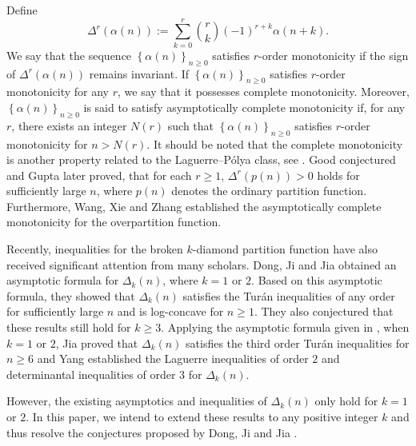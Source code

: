 \documentclass[12pt]{article}
\numberwithin{equation}{section}
\begin{document}
Define
$$
\Delta^r \left(\alpha(n)\right):=\sum_{k=0}^r\binom{r}{k}(-1)^{r+k} \alpha(n+k) .
$$
We say that the sequence $\left\{\alpha(n)\right\}_{n \geq 0}$ satisfies $r$-order monotonicity if the sign of $\Delta^r \left(\alpha(n)\right)$ remains invariant. If $\left\{\alpha(n)\right\}_{n \geq 0}$ satisfies $r$-order monotonicity for any $r$, we say that it possesses complete monotonicity. Moreover, $\left\{\alpha(n)\right\}_{n \geq 0}$ is said to satisfy asymptotically complete monotonicity if, for any $r$, there exists an integer $N(r)$ such that $\left\{\alpha(n)\right\}_{n \geq 0}$ satisfies $r$-order monotonicity for $n>N(r)$. It should be noted that the complete monotonicity is another property related to the Laguerre--P\'{o}lya class, see \cite{Craven-Csordas-1983}.  Good \cite{Good-1997} conjectured and Gupta \cite{Gupta-1978} later proved, that for each $r\geq1$, $\Delta^r \left(p(n)\right) > 0$ holds for sufficiently large $n$, where $p(n)$ denotes the ordinary partition function. Furthermore, Wang, Xie and Zhang \cite{Wang-Xie-Zhang-2018} established the asymptotically complete monotonicity for the overpartition function.



Recently, inequalities for the broken $k$-diamond partition function have also received significant attention from many scholars.
Dong, Ji and Jia \cite{Dong-Ji-Jia-2023} obtained an asymptotic formula for $\Delta_{k}(n)$, where $k=1$ or $2$. Based on this asymptotic formula, they showed that $\Delta_{k}(n)$ satisfies the Tur\'an inequalities of any order for sufficiently large $n$ and is log-concave for $n\geq1$. They also conjectured that these results still hold for $k\geq 3$. Applying the asymptotic formula given in \cite{Dong-Ji-Jia-2023}, when $k=1$ or $2$, Jia \cite{Jia-2023} proved that $\Delta_{k}(n)$ satisfies the third order Tur\'an inequalities for $n\geq 6$ and Yang \cite{Yang-2024} established the Laguerre inequalities of order $2$ and determinantal inequalities of order $3$ for $\Delta_{k}(n)$.

However, the existing asymptotics and inequalities of $\Delta_{k}(n)$ only hold for $k=1$ or $2$. In this paper, we intend to extend these results to any positive integer $k$ and thus resolve the conjectures proposed by Dong, Ji and Jia \cite{Dong-Ji-Jia-2023}.
\end{document}
